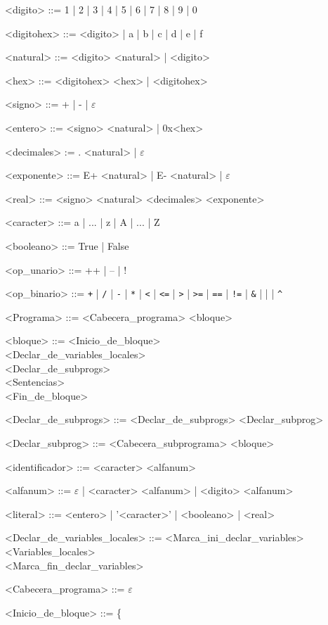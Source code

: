 \documentclass{scrartcl}
\begin{document}
\setlength{\grammarparsep}{4pt plus 1pt minus 1pt}
\begin{grammar}

<digito> ::= 1 | 2 | 3 | 4 | 5 | 6 | 7 | 8 | 9 | 0

<digitohex> ::= <digito> | a | b | c | d | e | f

<natural> ::= <digito> <natural> | <digito>

<hex> ::= <digitohex> <hex> | <digitohex>

<signo> ::= + | - | $\varepsilon$

<entero> ::= <signo> <natural> | 0x<hex>

<decimales> := . <natural> | $\varepsilon$

<exponente> ::= E+ <natural> | E- <natural> | $\varepsilon$

<real> ::= <signo> <natural> <decimales> <exponente>

<caracter> ::= a | ... | z | A | ... | Z

<booleano> ::= True | False

<op_unario> ::= ++ | -- | !

<op_binario> ::= \verb|+| | \verb|/| | \verb|-| | \verb|*| | \verb|<| | \verb|<=| | \verb|>| | \verb|>=| | \verb|==| | \verb|!=| | \verb|&| | \verb||| | \verb|^|

<Programa> ::= <Cabecera_programa> <bloque>

<bloque> ::= <Inicio_de_bloque> \\
 <Declar_de_variables_locales> \\
 <Declar_de_subprogs> \\
 <Sentencias> \\
 <Fin_de_bloque>

<Declar_de_subprogs> ::= <Declar_de_subprogs> <Declar_subprog>

<Declar_subprog> ::= <Cabecera_subprograma> <bloque>

<identificador> ::= <caracter> <alfanum>

<alfanum> ::= $\varepsilon$ | <caracter> <alfanum> | <digito> <alfanum>

<literal> ::= <entero> | '<caracter>' | <booleano> | <real>

<Declar_de_variables_locales> ::= <Marca_ini_declar_variables> \\
<Variables_locales> \\
<Marca_fin_declar_variables>

<Cabecera_programa> ::= $\varepsilon$

<Inicio_de_bloque> ::= \{


\end{grammar}
\end{document}
